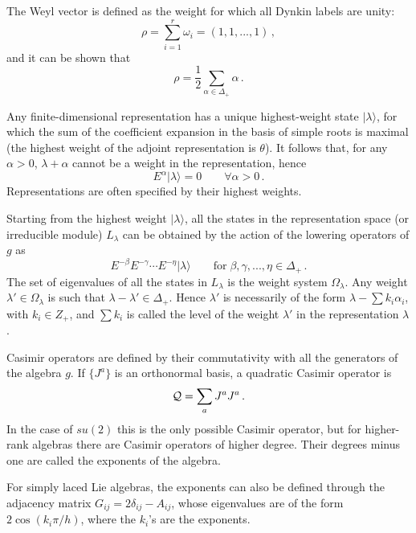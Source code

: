 \documentclass[a4paper,12pt]{report}
\begin{document}
The Weyl vector is defined as the weight for which all Dynkin labels are unity:
\begin{equation}
\rho=\sum_{i=1}^{r}\omega_{i}=(1,1,...,1)\,,
\end{equation}
and it can be shown that
\begin{equation}
\rho=\frac{1}{2}\sum_{\alpha\in\Delta_{+}}\alpha\,.
\end{equation}

Any finite-dimensional representation has a unique highest-weight state $|\lambda\rangle$, for which the sum of
the coefficient expansion in the basis of simple roots is maximal (the highest weight of the adjoint
representation is $\theta$). It follows that, for any $\alpha>0$, $\lambda+\alpha$ cannot be a weight in the
representation, hence
\begin{equation}
E^{\alpha}|\lambda\rangle=0\qquad\forall\alpha>0\,.
\end{equation}
Representations are often specified by their highest weights.

Starting from the highest weight $|\lambda\rangle$, all the states in the representation space (or irreducible
module) $L_{\lambda}$ can be obtained by the action of the lowering operators of $g$ as
\begin{equation}
E^{-\beta}E^{-\gamma}\cdots E^{-\eta}|\lambda\rangle\qquad \textrm{for} \; \beta,\gamma,...,\eta\in\Delta_{+}\,.
\end{equation}
The set of eigenvalues of all the states in $L_{\lambda}$ is the weight system $\Omega_{\lambda}$. Any weight
$\lambda'\in\Omega_{\lambda}$ is such that $\lambda-\lambda'\in\Delta_{+}$. Hence $\lambda'$ is necessarily of
the form $\lambda-\sum k_{i}\alpha_{i}$, with $k_{i}\in Z_{+}$, and  $\sum k_{i}$ is called the level of the
weight $\lambda'$ in the representation $\lambda$.

Casimir operators are defined by their commutativity with all the generators of the algebra $g$. If $\{J^{a}\}$
is an orthonormal basis, a quadratic Casimir operator is
\begin{equation}
{\cal Q}=\sum_{a}J^{a}J^{a}\,.
\end{equation}
In the case of $su(2)$ this is the only possible Casimir operator, but for higher-rank algebras there are Casimir
operators of higher degree. Their degrees minus one are called the exponents of the algebra.

For simply laced Lie algebras, the exponents can also be defined through the adjacency matrix
$G_{ij}=2\delta_{ij}-A_{ij}$, whose eigenvalues are of the form $2\cos(k_{i}\pi/h)$, where the $k_{i}$'s are the
exponents.
\end{document}
